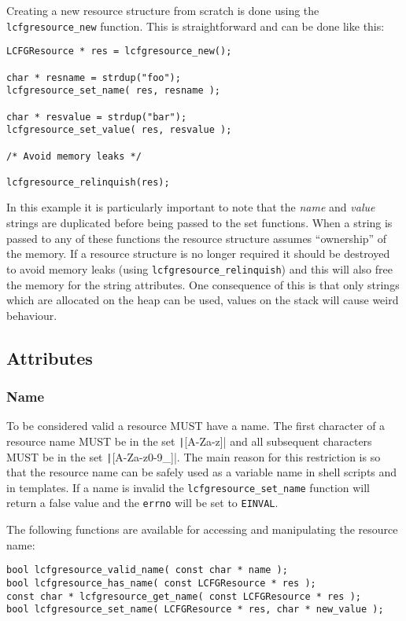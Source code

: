 \documentclass[11pt,a4paper,titlepage]{article}
\begin{document}
Creating a new resource structure from scratch is done using the
\texttt{lcfgresource\_new} function. This is straightforward and can
be done like this:

\begin{verbatim}
LCFGResource * res = lcfgresource_new();

char * resname = strdup("foo");
lcfgresource_set_name( res, resname );

char * resvalue = strdup("bar");
lcfgresource_set_value( res, resvalue );

/* Avoid memory leaks */

lcfgresource_relinquish(res);
\end{verbatim}

In this example it is particularly important to note that the
\textit{name} and \textit{value} strings are duplicated before being
passed to the set functions. When a string is passed to any of these
functions the resource structure assumes ``ownership'' of the
memory. If a resource structure is no longer required it should be
destroyed to avoid memory leaks (using
\texttt{lcfgresource\_relinquish}) and this will also free the
memory for the string attributes. One consequence of this is that only
strings which are allocated on the heap can be used, values on the
stack will cause weird behaviour.

\subsection{Attributes}

\subsubsection{Name}
\label{subsec:res_name}

To be considered valid a resource MUST have a name. The first
character of a resource name MUST be in the set \texttt|[A-Za-z]| and
all subsequent characters MUST be in the set
\texttt|[A-Za-z0-9_]|. The main reason for this restriction is so that
the resource name can be safely used as a variable name in shell
scripts and in templates. If a name is invalid the
\texttt{lcfgresource\_set\_name} function will return a false value
and the \texttt{errno} will be set to \texttt{EINVAL}.

The following functions are available for accessing and manipulating
the resource name:

\begin{verbatim}
bool lcfgresource_valid_name( const char * name );
bool lcfgresource_has_name( const LCFGResource * res );
const char * lcfgresource_get_name( const LCFGResource * res );
bool lcfgresource_set_name( LCFGResource * res, char * new_value );
\end{verbatim}
\end{document}
